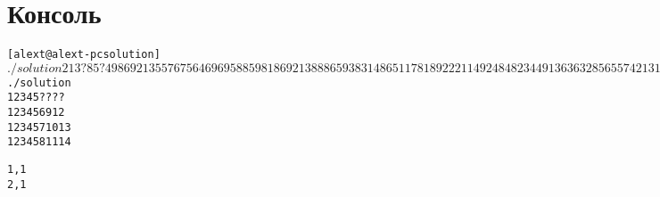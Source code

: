 \section{Консоль}
\begin{alltt}
[alext@alext-pc solution]$ ./solution 
213 ? 8 5 ?
49869 213 5 5 767 564 6969 5 8 8 5 981 8 69 213 8 8 86 5 938
314 8 65 11781 892 22114 9248 4823 44913 63632 8 5 65 5 74 213 13373 8 5 19
8 213 99642 8 5 5 3748 7734 56653 8 8494 5 58 4835 1 56771 213 8 213 62921
9 8152 6 213 213 23791 213 5 213 91167 5 61 8 5 8 5 213 213 64 5
5 8 8 8726 29669 1163 8 213 64987 93 213 8 9996 1 5 8 7156 8 213 7
56711 8 167 135 96 4289 5 58142 286 8 51827 14 213 3388 8341 8 213 24 5 213
8 14 3222 4833 9 213 8 213 5 12 7362 73 963 7 5 213 634 213 5 17678
8 9136 816 27 5 92947 213 89833 278 54646 5 8 87815 8 11729 213 8 93667 8 7186
5 8 35 5 213 213 51278 5 213 45 213 8 8 6 449 8 92 5 5 8
642 213 3345 83 8 3 6682 5 31332 213 213 8 5 7195 8 7159 145 8 213 8

2, 16
3, 2
10, 10

[alext@alext-pc solution]$ ./solution 
1 2 3 4 5 ? ? ? ?
1 2 3 4 5 6 9 12
1 2 3 4 5 7 10 13
1 2 3 4 5 8 11 14

1, 1
2, 1
\end{alltt}
\pagebreak

